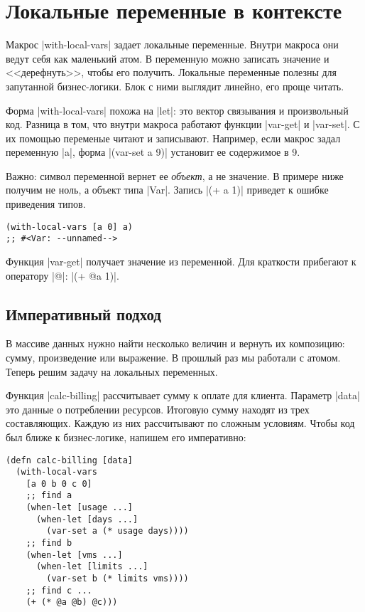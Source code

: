 \section{Локальные переменные в контексте}

Макрос \spverb|with-local-vars| задает локальные переменные. Внутри макроса они
ведут себя как маленький атом. В переменную можно записать значение и
<<дерефнуть>>, чтобы его получить. Локальные переменные полезны для запутанной
бизнес-логики. Блок с ними выглядит линейно, его проще читать.

Форма \spverb|with-local-vars| похожа на \spverb|let|: это вектор связывания и
произвольный код. Разница в том, что внутри макроса работают функции
\spverb|var-get| и \spverb|var-set|. С их помощью переменые читают и
записывают. Например, если макрос задал переменную \spverb|a|, форма
\spverb|(var-set a 9)| установит ее содержимое в 9.

Важно: символ переменной вернет ее \emph{объект}, а не значение. В примере ниже
получим не ноль, а объект типа \spverb|Var|. Запись \spverb|(+ a 1)| приведет к
ошибке приведения типов.

\begin{verbatim}
(with-local-vars [a 0] a)
;; #<Var: --unnamed-->
\end{verbatim}

Функция \spverb|var-get| получает значение из переменной. Для краткости
прибегают к оператору \spverb|@|: \spverb|(+ @a 1)|.

\subsection{Императивный подход}

В массиве данных нужно найти несколько величин и вернуть их композицию: сумму,
произведение или выражение. В прошлый раз мы работали с атомом. Теперь решим
задачу на локальных переменных.

Функция \spverb|calc-billing| рассчитывает сумму к оплате для клиента. Параметр
\spverb|data| это данные о потреблении ресурсов. Итоговую сумму находят из трех
составляющих. Каждую из них рассчитывают по сложным условиям. Чтобы код был
ближе к бизнес-логике, напишем его императивно:

\begin{verbatim}
(defn calc-billing [data]
  (with-local-vars
    [a 0 b 0 c 0]
    ;; find a
    (when-let [usage ...]
      (when-let [days ...]
        (var-set a (* usage days))))
    ;; find b
    (when-let [vms ...]
      (when-let [limits ...]
        (var-set b (* limits vms))))
    ;; find c ...
    (+ (* @a @b) @c)))
\end{verbatim}

